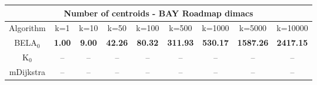 \begin{tabular}{c|cccccccc}\toprule
\multicolumn{9}{c}{Number of centroids - BAY Roadmap dimacs}\\ \midrule
Algorithm & k=1 & k=10 & k=50 & k=100 & k=500 & k=1000 & k=5000 & k=10000 \\ \midrule
BELA$_0$ & \textbf{1.00} & \textbf{9.00} & \textbf{42.26} & \textbf{80.32} & \textbf{311.93} & \textbf{530.17} & \textbf{1587.26} & \textbf{2417.15} \\
K$_0$ & -- & -- & -- & -- & -- & -- & -- & -- \\
mDijkstra & -- & -- & -- & -- & -- & -- & -- & -- \\ \bottomrule 
\end{tabular}
